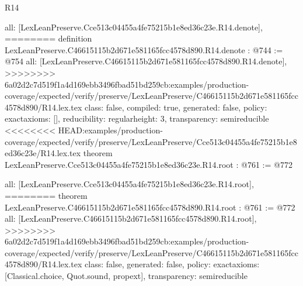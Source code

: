 \begin{lexlean}{R14}
\begin{coremodule}
{{{{{{{{{{{  all: [LexLeanPreserve.Cce513c04455a4fe75215b1e8ed36c23e.R14.denote],
========
definition LexLeanPreserve.C46615115b2d671e581165fcc4578d890.R14.denote : @744 := @754 {
  all: [LexLeanPreserve.C46615115b2d671e581165fcc4578d890.R14.denote],
>>>>>>>> 6a02d2c7d519f1a4d169ebb3496fbad51bd259cb:examples/production-coverage/expected/verify/preserve/LexLeanPreserve/C46615115b2d671e581165fcc4578d890/R14.lex.tex
  class: false,
  compiled: true,
  generated: false,
  policy: exact{axioms: []},
  reducibility: regular{height: 3},
  transparency: semireducible
}
<<<<<<<< HEAD:examples/production-coverage/expected/verify/preserve/LexLeanPreserve/Cce513c04455a4fe75215b1e8ed36c23e/R14.lex.tex
theorem LexLeanPreserve.Cce513c04455a4fe75215b1e8ed36c23e.R14.root : @761 := @772 {
  all: [LexLeanPreserve.Cce513c04455a4fe75215b1e8ed36c23e.R14.root],
========
theorem LexLeanPreserve.C46615115b2d671e581165fcc4578d890.R14.root : @761 := @772 {
  all: [LexLeanPreserve.C46615115b2d671e581165fcc4578d890.R14.root],
>>>>>>>> 6a02d2c7d519f1a4d169ebb3496fbad51bd259cb:examples/production-coverage/expected/verify/preserve/LexLeanPreserve/C46615115b2d671e581165fcc4578d890/R14.lex.tex
  class: false,
  generated: false,
  policy: exact{axioms: [Classical.choice, Quot.sound, propext]},
  transparency: semireducible
}

}}}}}}}}}}}}
\end{coremodule}
\end{lexlean}
